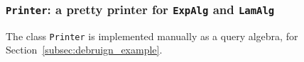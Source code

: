 
\subsubsection{\lstinline{Printer}: a pretty printer for \lstinline{ExpAlg} and \lstinline{LamAlg}}\label{subsec:appendix_printer}

The class \lstinline{Printer} is implemented manually as a query algebra, for Section~\ref{subsec:debruign_example}.

